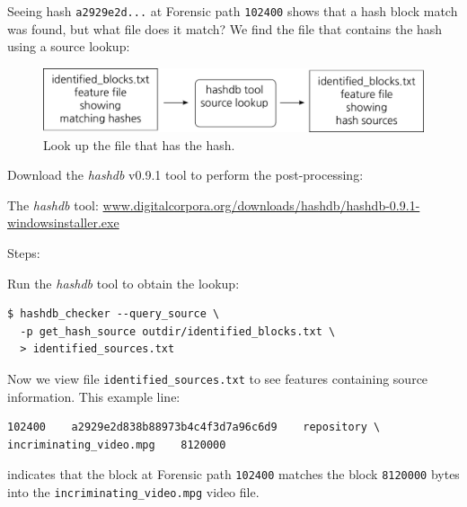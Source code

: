 \documentclass[12pt,twoside]{article}
\newcommand{\hdb}{\emph{hashdb}\xspace}
\begin{document}
Seeing hash \texttt{a2929e2d...} at Forensic path \texttt{102400}
shows that a hash block match was found, but what file does it match?
We find the file that contains the hash using a source lookup:
\begin{figure}[H]
  \center
  \includegraphics[scale=0.5]{drawings/source_lookup}
  \caption*{Look up the file that has the hash.}
  \label{fig:source_lookup}
\end{figure}

Download the \hdb v0.9.1 tool to perform the post-processing:
\begin{compactitem}
\item The \hdb tool: 
\url{www.digitalcorpora.org/downloads/hashdb/hashdb-0.9.1-windowsinstaller.exe}
\end{compactitem}

Steps:
\begin{compactenum}
\item Run the \hdb tool to obtain the lookup:
\begin{verbatim}
$ hashdb_checker --query_source \
  -p get_hash_source outdir/identified_blocks.txt \
  > identified_sources.txt
\end{verbatim}
\end{compactenum}

Now we view file \texttt{identified\_sources.txt} to see
features containing source information.
This example line:
\begin{verbatim}
102400    a2929e2d838b88973b4c4f3d7a96c6d9    repository \
incriminating_video.mpg    8120000
\end{verbatim}

indicates that the block at Forensic path \texttt{102400}
matches the block \texttt{8120000} bytes into the
\texttt{incriminating\_video.mpg} video file.
\end{document}
